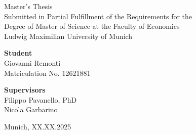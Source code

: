 \begin{titlepage}


\vfill

\large
Master's Thesis\\

Submitted in Partial Fulfillment of the Requirements for the\\Degree of Master of Science at the Faculty of Economics\\
Ludwig Maximilian University of Munich\\

\vfill

\begin{multicols}{2}
\raggedright
\textbf{Student}\\
Giovanni Remonti\\
Matriculation No. 12621881

\columnbreak

\begin{flushright}
\textbf{Supervisors}\\
Filippo Pavanello, PhD\\
Nicola Garbarino
\end{flushright}
\end{multicols}

\vfill

\begin{flushright}
Munich, XX.XX.2025
\end{flushright}

\end{titlepage}